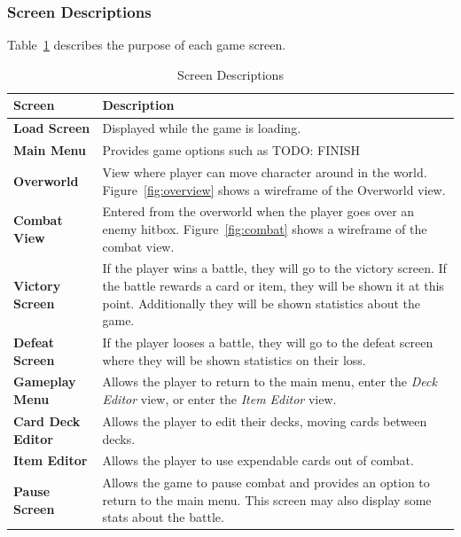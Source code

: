 \documentclass[12pt,titlepage]{article}
\begin{document}
\subsubsection{Screen Descriptions}
%
Table~\ref{tab:screen_purpose} describes the purpose of each game screen.
\begin{table}[H]
    \centering
    \caption{Screen Descriptions}
    \label{tab:screen_purpose}
    \begin{tabularx}{\textwidth}{|l | X |}
        \hline
        \textbf{Screen} & \textbf{Description} \\
        \hline\hline
        \textbf{Load Screen} & Displayed while the game is loading. \\
        \hline
        \textbf{Main Menu} & Provides game options such as TODO: FINISH \\
        \hline
        \textbf{Overworld} & View where player can move character around in the
        world. Figure~\ref{fig:overview} shows a wireframe of the Overworld
        view. \\
        \hline
        \textbf{Combat View} & Entered from the overworld when the player goes
        over an enemy hitbox. Figure~\ref{fig:combat} shows a wireframe of the
        combat view. \\
        \hline
        \textbf{Victory Screen} & If the player wins a battle, they will go to
        the victory screen. If the battle rewards a card or item, they will be
        shown it at this point. Additionally they will be shown statistics about
        the game. \\
        \hline
        \textbf{Defeat Screen} & If the player looses a battle, they will go to
        the defeat screen where they will be shown statistics on their loss. \\
        \hline
        \textbf{Gameplay Menu} & Allows the player to return to the main menu,
        enter the \textit{Deck Editor} view, or enter the \textit{Item Editor}
        view. \\
        \hline
        \textbf{Card Deck Editor} & Allows the player to edit their decks,
        moving cards between decks. \\
        \hline
        \textbf{Item Editor} & Allows the player to use expendable cards out of
        combat. \\
        \hline
        \textbf{Pause Screen} & Allows the game to pause combat and provides an
        option to return to the main menu. This screen may also display some
        stats about the battle. \\
        \hline
    \end{tabularx}
\end{table}
\end{document}
